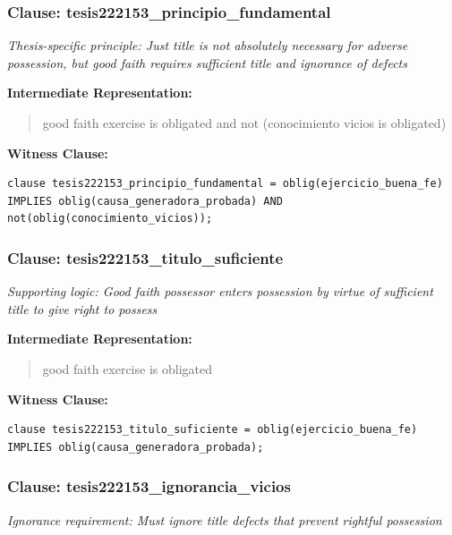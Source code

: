 \documentclass[11pt,a4paper]{article}
\begin{document}
\subsubsection{Clause: tesis222153\_principio\_fundamental}

\textit{Thesis-specific principle: Just title is not absolutely necessary for adverse possession, but good faith requires sufficient title and ignorance of defects}

\textbf{Intermediate Representation:}

\begin{quote}
good faith exercise is obligated and not (conocimiento vicios is obligated)
\end{quote}

\textbf{Witness Clause:}

\begin{lstlisting}[style=witnessstyle, language=Witness]
clause tesis222153_principio_fundamental = oblig(ejercicio_buena_fe) IMPLIES oblig(causa_generadora_probada) AND not(oblig(conocimiento_vicios));
\end{lstlisting}

\subsubsection{Clause: tesis222153\_titulo\_suficiente}

\textit{Supporting logic: Good faith possessor enters possession by virtue of sufficient title to give right to possess}

\textbf{Intermediate Representation:}

\begin{quote}
good faith exercise is obligated
\end{quote}

\textbf{Witness Clause:}

\begin{lstlisting}[style=witnessstyle, language=Witness]
clause tesis222153_titulo_suficiente = oblig(ejercicio_buena_fe) IMPLIES oblig(causa_generadora_probada);
\end{lstlisting}

\subsubsection{Clause: tesis222153\_ignorancia\_vicios}

\textit{Ignorance requirement: Must ignore title defects that prevent rightful possession}
\end{document}
